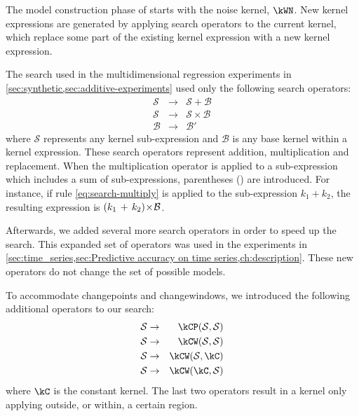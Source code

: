 The model construction phase of \procedurename{} starts with the noise kernel, $\kWN$.
New kernel expressions are generated by applying search operators to the current kernel, which replace some part of the existing kernel expression with a new kernel expression.



The search used in the multidimensional regression experiments in \cref{sec:synthetic,sec:additive-experiments} used only the following search operators:
%
\begin{eqnarray}
\mathcal{S} &\to& \mathcal{S} + \mathcal{B} \\
\mathcal{S} &\to& \mathcal{S} \times \mathcal{B} \label{eq:search-multiply}\\
\mathcal{B} &\to& \mathcal{B'}
\end{eqnarray}
%
where $\mathcal{S}$ represents any kernel sub-expression and $\mathcal{B}$ is any base kernel within a kernel expression.
These search operators represent addition, multiplication and replacement.
When the multiplication operator is applied to a sub-expression which includes a sum of sub-expressions, parentheses () are introduced.
For instance, if rule \eqref{eq:search-multiply} is applied to the sub-expression $k_1 + k_2$, the resulting expression is $(k_1 \, + \, k_2) \! \times \! \mathcal{B}$.

Afterwards, we added several more search operators in order to speed up the search.
This expanded set of operators was used in the experiments in \cref{sec:time_series,sec:Predictive accuracy on time series,ch:description}.
These new operators do not change the set of possible models.

To accommodate changepoints and changewindows, we introduced the following additional operators to our search:
%
\begin{eqnarray}
\mathcal{S} &\to& \kCP(\mathcal{S},\mathcal{S}) \\
\mathcal{S} &\to& \kCW(\mathcal{S},\mathcal{S}) \\
\mathcal{S} &\to& \kCW(\mathcal{S},\kC) \\
\mathcal{S} &\to& \kCW(\kC,\mathcal{S})
\end{eqnarray}
%
where $\kC$ is the constant kernel.
The last two operators result in a kernel only applying outside, or within, a certain region.

